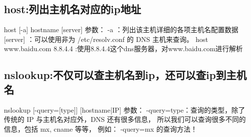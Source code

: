 \documentclass[a4paper,left=1.5cm,right=1.5cm,11pt]{article}
\begin{document}
\subsection{host:列出主机名对应的ip地址}
    host [-a] hostname [server]
    参数：
    -a ：列出该主机详细的各项主机名配置数据
    [server] ：可以使用非为 /etc/resolv.conf 的 DNS 主机来查询。
    host www.baidu.com 8.8.4.4  :使用8.8.4.4这个dns服务器，对www.baidu.com进行解析
\subsection{nslookup:不仅可以查主机名到ip，还可以查ip到主机名}
     nslookup [-query=[type]] [hostname|IP]
     参数：
     -query=type：查询的类型，除了传统的 IP 与主机名对应外，DNS 还有很多信息，
                所以我们可以查询很多不同的信息，包括 mx, cname 等等，
                例如： -query=mx 的查询方法！
\end{document}
